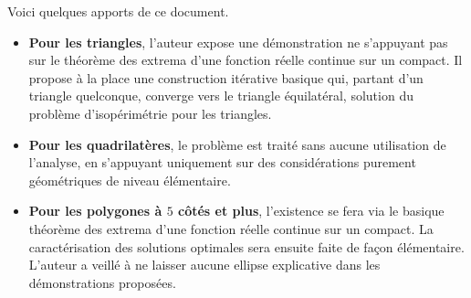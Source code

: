 Voici quelques apports de ce document.

\begin{itemize}
    \item \textbf{Pour les triangles}, l'auteur expose une démonstration ne s'appuyant pas sur le théorème des extrema d'une fonction réelle continue sur un compact. 
    Il propose à la place une construction itérative basique qui, partant d'un triangle quelconque, converge vers le triangle équilatéral, solution du problème d'isopérimétrie pour les triangles.
    
    \item \textbf{Pour les quadrilatères}, le problème est traité sans aucune utilisation de l'analyse, en s'appuyant uniquement sur des considérations purement géométriques de niveau élémentaire.

    \item \textbf{\boldmath Pour les polygones à $5$ côtés et plus}, l'existence se fera via le basique théorème des extrema d'une fonction réelle continue sur un compact. La caractérisation des solutions optimales sera ensuite faite de façon élémentaire.
    L'auteur a veillé à ne laisser aucune ellipse explicative dans les démonstrations proposées.
\end{itemize}

